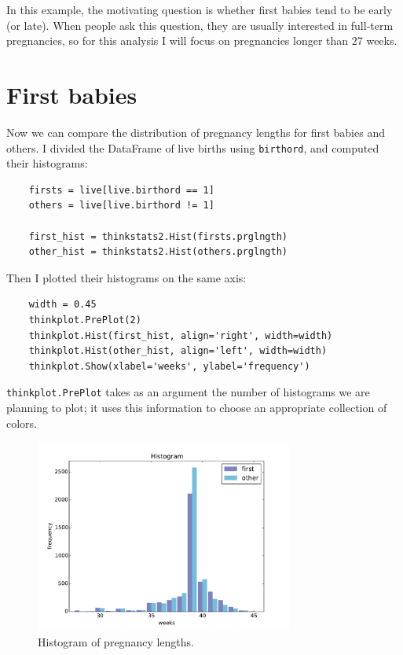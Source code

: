 \documentclass[12pt]{book}
\begin{document}
In this example, the motivating question is whether first babies
tend to be early (or late).  When people ask this question, they are
usually interested in full-term pregnancies, so for this analysis
I will focus on pregnancies longer than 27 weeks.


\section{First babies}

Now we can compare the distribution of pregnancy lengths for first
babies and others.  I divided the DataFrame of live births using
{\tt birthord}, and computed their histograms:

\begin{verbatim}
    firsts = live[live.birthord == 1]
    others = live[live.birthord != 1]

    first_hist = thinkstats2.Hist(firsts.prglngth)
    other_hist = thinkstats2.Hist(others.prglngth)
\end{verbatim}

Then I plotted their histograms on the same axis:

\begin{verbatim}
    width = 0.45
    thinkplot.PrePlot(2)
    thinkplot.Hist(first_hist, align='right', width=width)
    thinkplot.Hist(other_hist, align='left', width=width)
    thinkplot.Show(xlabel='weeks', ylabel='frequency')
\end{verbatim}

{\tt thinkplot.PrePlot} takes as an argument the number of histograms
we are planning to plot; it uses this information to choose
an appropriate collection of colors.

\begin{figure}
\centerline{\includegraphics[height=2.5in]{figs/first_nsfg_hist.pdf}}
\caption{Histogram of pregnancy lengths.}
\label{first_nsfg_hist}
\end{figure}
\end{document}
